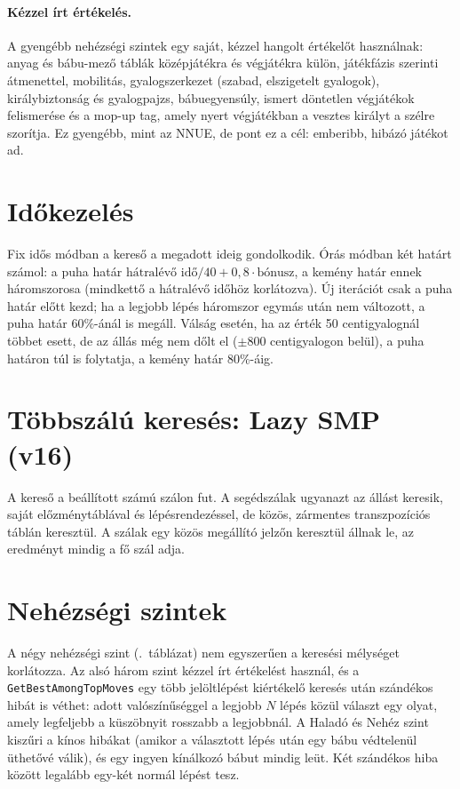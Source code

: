 \paragraph{Kézzel írt értékelés.} A gyengébb nehézségi szintek egy saját, kézzel hangolt értékelőt használnak: anyag és bábu-mező táblák középjátékra és végjátékra külön, játékfázis szerinti átmenettel, mobilitás, gyalogszerkezet (szabad, elszigetelt gyalogok), királybiztonság és gyalogpajzs, bábuegyensúly, ismert döntetlen végjátékok felismerése és a mop-up tag, amely nyert végjátékban a vesztes királyt a szélre szorítja. Ez gyengébb, mint az NNUE, de pont ez a cél: emberibb, hibázó játékot ad.

\section{Időkezelés}\label{sec:time}

Fix idős módban a kereső a megadott ideig gondolkodik. Órás módban két határt számol: a puha határ $\text{hátralévő idő}/40 + 0{,}8\cdot\text{bónusz}$, a kemény határ ennek háromszorosa (mindkettő a hátralévő időhöz korlátozva). Új iterációt csak a puha határ előtt kezd; ha a legjobb lépés háromszor egymás után nem változott, a puha határ 60\%-ánál is megáll. Válság esetén, ha az érték 50 centigyalognál többet esett, de az állás még nem dőlt el ($\pm800$ centigyalogon belül), a puha határon túl is folytatja, a kemény határ 80\%-áig.

\section{Többszálú keresés: Lazy SMP (v16)}\label{sec:lazysmp}

A kereső a beállított számú szálon fut. A segédszálak ugyanazt az állást keresik, saját előzménytáblával és lépésrendezéssel, de közös, zármentes transzpozíciós táblán keresztül. A szálak egy közös megállító jelzőn keresztül állnak le, az eredményt mindig a fő szál adja.

\section{Nehézségi szintek}

A négy nehézségi szint (.~táblázat) nem egyszerűen a keresési mélységet korlátozza. Az alsó három szint kézzel írt értékelést használ, és a \texttt{GetBestAmongTopMoves} egy több jelöltlépést kiértékelő keresés után szándékos hibát is véthet: adott valószínűséggel a legjobb $N$ lépés közül választ egy olyat, amely legfeljebb a küszöbnyit rosszabb a legjobbnál. A Haladó és Nehéz szint kiszűri a kínos hibákat (amikor a választott lépés után egy bábu védtelenül üthetővé válik), és egy ingyen kínálkozó bábut mindig leüt. Két szándékos hiba között legalább egy-két normál lépést tesz.

